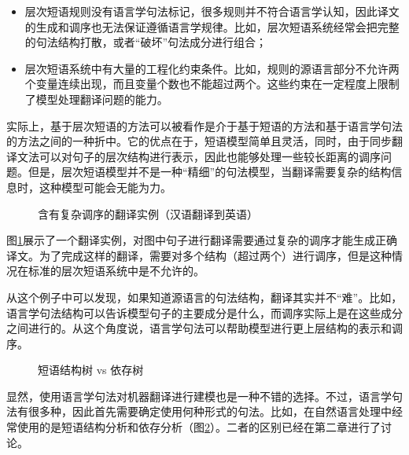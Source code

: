 \begin{itemize}
\vspace{0.5em}
\item 层次短语规则没有语言学句法标记，很多规则并不符合语言学认知，因此译文的生成和调序也无法保证遵循语言学规律。比如，层次短语系统经常会把完整的句法结构打散，或者“破坏”句法成分进行组合；
\vspace{0.5em}
\item 层次短语系统中有大量的工程化约束条件。比如，规则的源语言部分不允许两个变量连续出现，而且变量个数也不能超过两个。这些约束在一定程度上限制了模型处理翻译问题的能力。
\vspace{0.5em}
\end{itemize}

\parinterval 实际上，基于层次短语的方法可以被看作是介于基于短语的方法和基于语言学句法的方法之间的一种折中。它的优点在于，短语模型简单且灵活，同时，由于同步翻译文法可以对句子的层次结构进行表示，因此也能够处理一些较长距离的调序问题。但是，层次短语模型并不是一种“精细”的句法模型，当翻译需要复杂的结构信息时，这种模型可能会无能为力。

\begin{figure}[htp]
\centering

\setlength{\belowcaptionskip}{-0.5em}
\caption{含有复杂调序的翻译实例（汉语翻译到英语）}
\label{fig:8-15}
\end{figure}

\parinterval 图\ref{fig:8-15}展示了一个翻译实例，对图中句子进行翻译需要通过复杂的调序才能生成正确译文。为了完成这样的翻译，需要对多个结构（超过两个）进行调序，但是这种情况在标准的层次短语系统中是不允许的。

\parinterval 从这个例子中可以发现，如果知道源语言的句法结构，翻译其实并不“难”。比如，语言学句法结构可以告诉模型句子的主要成分是什么，而调序实际上是在这些成分之间进行的。从这个角度说，语言学句法可以帮助模型进行更上层结构的表示和调序。

\begin{figure}[htp]
\centering

\setlength{\belowcaptionskip}{-1.0em}
\caption{短语结构树 vs 依存树}
\label{fig:8-16}
\end{figure}

\parinterval 显然，使用语言学句法对机器翻译进行建模也是一种不错的选择。不过，语言学句法有很多种，因此首先需要确定使用何种形式的句法。比如，在自然语言处理中经常使用的是短语结构分析和依存分析（图\ref{fig:8-16}）。二者的区别已经在第二章进行了讨论。

